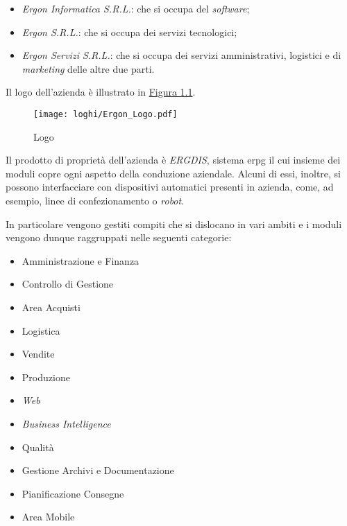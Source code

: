\begin{itemize}
    \item \textit{Ergon Informatica S.R.L.}: che si occupa del \textit{software};
    \item \textit{Ergon S.R.L.}: che si occupa dei servizi tecnologici;
    \item \textit{Ergon Servizi S.R.L.}: che si occupa dei servizi amministrativi, logistici e di \textit{marketing} delle altre due parti.
\end{itemize}
Il logo dell'azienda è illustrato in \hyperref[fig:logo]{Figura 1.1}.
\vfill
\begin{figure}[!h]
    \centering
    \texttt{[image: loghi/Ergon\_Logo.pdf]}
    \caption{Logo \myCompany}
    \label{fig:logo}
\end{figure}
\vfill
\noindent Il prodotto di proprietà dell'azienda è \textit{ERGDIS}, sistema \gls{erpg}
il cui insieme dei moduli copre ogni aspetto della conduzione aziendale.
Alcuni di essi, inoltre, si possono interfacciare con dispositivi automatici presenti in azienda, come, ad esempio,
linee di confezionamento o \textit{robot}.

\newpage
\noindent In particolare  vengono gestiti compiti che si dislocano in vari ambiti e
i moduli vengono dunque raggruppati nelle seguenti categorie:
\begin{multicols}{2}
\begin{itemize}
    \item Amministrazione e Finanza
    \item Controllo di Gestione
    \item Area Acquisti
    \item Logistica
    \item Vendite
    \item Produzione
\end{itemize}
\begin{itemize}
    \item \textit{Web}
    \item \textit{Business Intelligence}
    \item Qualità
    \item Gestione Archivi e Documentazione
    \item Pianificazione Consegne
    \item Area Mobile
\end{itemize}
\end{multicols}

